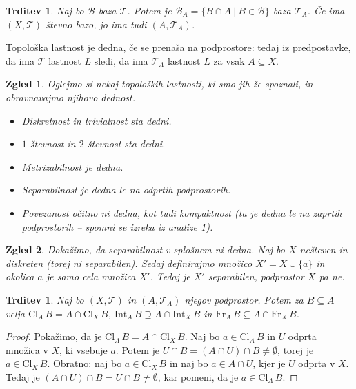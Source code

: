 \documentclass[10pt, a4paper]{article}
\newtheorem{trditev}[izr]{Trditev}
\newtheorem{zgled}{Zgled}[section]
\newenvironment{noticeC}{%
  \tcolorbox[%
  notitle,
  empty,
  enhanced,  %
  breakable,
  coltext=black, 
  fontupper=\rmfamily,
  parbox=false,
  noparskip,
  sharp corners,
  boxrule=-1pt,  %
  frame hidden,
  left=7pt,  %
  right=7pt,
  top=5pt,
  bottom=5pt,
  before skip=2.5ex plus 2pt,
  after skip=2.5ex plus 2pt,
  overlay unbroken and last={%
  },
  ]}
{\endtcolorbox}
\newenvironment{dokaz}%
  {\begin{noticeC}\begin{proof}}%
  {\end{proof}\end{noticeC}}
\newcommand{\topo}[1]{\mathcal{#1}}
\newcommand{\cl}{\mathrm{Cl}}
\newcommand{\inte}{\mathrm{Int}}
\newcommand{\fr}{\mathrm{Fr}}
\begin{document}
\begin{trditev}
  Naj bo $\mathcal{B}$ baza $\topo{T}$. Potem je $\mathcal{B}_A = \{B \cap A\ |\ B \in \topo{B}\}$ baza $\topo{T}_A$.
  Če ima $(X, \topo{T})$ števno bazo, jo ima tudi $(A, \topo{T}_A)$.
\end{trditev}

Topološka lastnost je dedna, če se prenaša na podprostore: tedaj iz predpostavke, da ima $\topo{T}$ lastnost $L$ sledi,
da ima $\topo{T}_A$ lastnost $L$ za vsak $A \subseteq X$.

\begin{zgled}
  Oglejmo si nekaj topoloških lastnosti, ki smo jih že spoznali, in obravnavajmo njihovo dednost.
  \begin{itemize}
    \item Diskretnost in trivialnost sta dedni.
    \item $1$-števnost in $2$-števnost sta dedni.
    \item Metrizabilnost je dedna.
    \item Separabilnost je dedna le na odprtih podprostorih.
    \item Povezanost očitno ni dedna, kot tudi kompaktnost (ta je dedna le na zaprtih podprostorih -- spomni se izreka iz analize 1).
  \end{itemize}
\end{zgled}

\begin{zgled}
  Dokažimo, da separabilnost v splošnem ni dedna.
  Naj bo $X$ nešteven in diskreten (torej ni separabilen).
  Sedaj definirajmo množico $X' = X \cup \{a\}$ in okolica $a$ je samo cela množica $X'$.
  Tedaj je $X'$ separabilen, podprostor $X$ pa ne.
\end{zgled}

\begin{trditev}
  Naj bo $(X, \mathcal{T})$ in $(A, \mathcal{T}_A)$ njegov podprostor.
  Potem za $B \subseteq A$ velja $\cl_A\, {B} = A \cap \cl_X \, B$, $\inte_A\, B\supseteq A \cap \inte_X \, B$ 
  in $\fr_A \, B \subseteq A \cap \fr_X \, B$.
\end{trditev}

\begin{dokaz}
  Pokažimo, da je $\cl_A \, B = A \cap \cl_X \, B$.
  Naj bo $a \in \cl_A \, B$ in $U$ odprta množica v $X$, ki vsebuje $a$.
  Potem je $U \cap B = (A \cap U) \cap B \neq \emptyset$, torej je $a \in \cl_X\, B$.
  Obratno: naj bo $a \in \cl_X \, B$ in naj bo $a \in A \cap U$, kjer je $U$ odprta v $X$.
  Tedaj je $(A \cap U) \cap B = U \cap B \neq \emptyset$, kar pomeni, da je $a \in \cl_A\, B$.
\end{dokaz}
\end{document}
